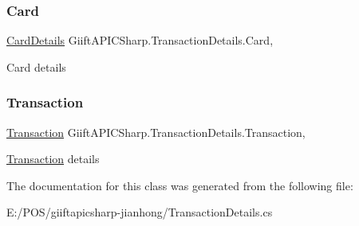 \subsubsection{\texorpdfstring{Card}{Card}}
{\footnotesize\ttfamily \hyperlink{class_giift_a_p_i_c_sharp_1_1_card_details}{Card\+Details} Giift\+A\+P\+I\+C\+Sharp.\+Transaction\+Details.\+Card\hspace{0.3cm}{\ttfamily [get]}, {\ttfamily [set]}}



Card details 

\mbox{\label{class_giift_a_p_i_c_sharp_1_1_transaction_details_a3b45e4af0759b309181349c4422e0d17}} 
\subsubsection{\texorpdfstring{Transaction}{Transaction}}
{\footnotesize\ttfamily \hyperlink{class_giift_a_p_i_c_sharp_1_1_transaction}{Transaction} Giift\+A\+P\+I\+C\+Sharp.\+Transaction\+Details.\+Transaction\hspace{0.3cm}{\ttfamily [get]}, {\ttfamily [set]}}



\hyperlink{class_giift_a_p_i_c_sharp_1_1_transaction}{Transaction} details 



The documentation for this class was generated from the following file\+:\begin{DoxyCompactItemize}
\item 
E\+:/\+P\+O\+S/giiftapicsharp-\/jianhong/Transaction\+Details.\+cs\end{DoxyCompactItemize}
